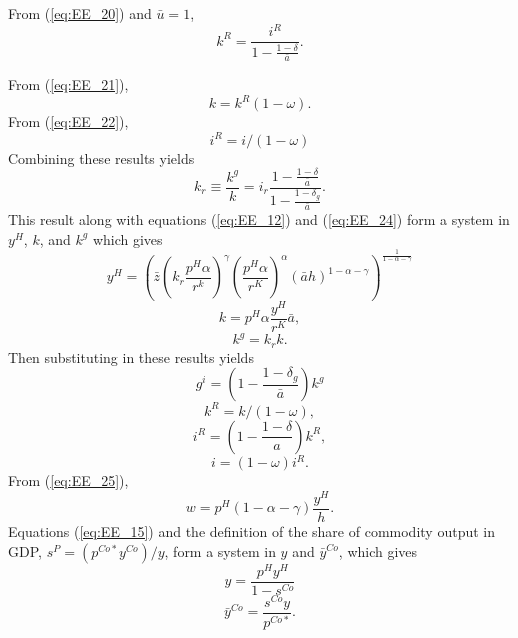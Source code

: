 \documentclass[12pt]{article}
\begin{document}
\noindent From (\ref{eq:EE_20}) and $\bar{u} = 1$,%
\begin{equation*}
k^R=\frac{i^R}{ 1-\frac{1-\delta} {\bar{a}}}.
\end{equation*}%

\noindent From (\ref{eq:EE_21}),
\begin{equation*}
k = k^R(1-\omega).
\end{equation*}\noindent From (\ref{eq:EE_22}),
\begin{equation*}
i^R = i/(1-\omega)
\end{equation*}
Combining these results yields 
\begin{equation*}
 k_r \equiv \frac{k^g}{k} = i_r\frac{1-\frac{1-\delta}{\bar{a}}}{1-\frac{1-\delta_g}{\bar{a}}}.   
\end{equation*}
This result along with equations (\ref{eq:EE_12}) and (\ref{eq:EE_24}) form a system in $y^H$, $k$, and $k^g$ which gives
\begin{equation*}
y^H = \left(\bar{z}\left(k_r\frac{ p^H\alpha}{r^k}\right)^\gamma\left(\frac{p^H\alpha}{r^K}\right)^\alpha(\bar{a}h)^{1-\alpha-\gamma}\right)^{\frac{1}{1-\alpha-\gamma}}
\end{equation*}%
\begin{equation*}
k = p^H \alpha \frac{y^H}{r^K}\bar{a},
\end{equation*}%
\begin{equation*}
k^g = k_rk.
\end{equation*}
Then substituting in these results yields 
\begin{equation*}
 g^i = \left(1-\frac{1-\delta_g}{\bar{a}}\right)k^g 
\end{equation*}
\begin{equation*}
k^R = k/(1-\omega),    
\end{equation*}
\begin{equation*}
 i^R = \left(1-\frac{1-\delta}{a}\right)k^R,
\end{equation*}
\begin{equation*}
i = (1-\omega)i^R.    
\end{equation*}
From (\ref{eq:EE_25}),
\begin{equation*}
w = p^H(1-\alpha-\gamma)\frac{y^H}{h}.
\end{equation*}%
Equations (\ref{eq:EE_15}) and the definition of the share of commodity output in GDP, $s^P=(p^{Co\ast}y^{Co})/y$, form a system in $y$ and $\bar{y}^{Co}$, which gives
\begin{equation*}
y = \frac{p^H y^H}{1-s^{Co}}
\end{equation*}%
\begin{equation*}
\bar{y}^{Co} = \frac{s^{Co}y}{p^{Co\ast}}.
\end{equation*}%
\end{document}
